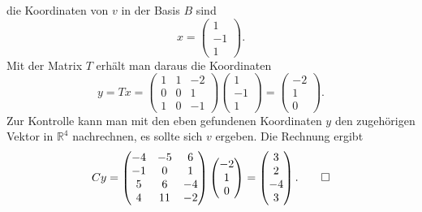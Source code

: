 \begin{loesung}
die Koordinaten von $v$ in der Basis $B$ sind 
\[
x
=
\begin{pmatrix}
1\\-1\\1
\end{pmatrix}.
\]
Mit der Matrix $T$ erhält man daraus die Koordinaten
\[
y=T x=
\begin{pmatrix}
1&1&-2\\
0&0& 1\\
1&0&-1
\end{pmatrix}
\begin{pmatrix}
1\\-1\\1
\end{pmatrix}
=
\begin{pmatrix}
-2\\1\\0
\end{pmatrix}.
\]
Zur Kontrolle kann man mit den eben gefundenen Koordinaten $y$ den
zugehörigen Vektor in $\mathbb R^4$ nachrechnen, es sollte sich $v$
ergeben. Die Rechnung ergibt
\[
C y=
\begin{pmatrix}
-4&-5& 6\\
-1& 0& 1\\
 5& 6&-4\\
 4&11&-2
\end{pmatrix}
\begin{pmatrix}
-2\\1\\0
\end{pmatrix}
=
\begin{pmatrix}
3\\2\\-4\\3
\end{pmatrix}.
\qedhere
\]
\end{loesung}


